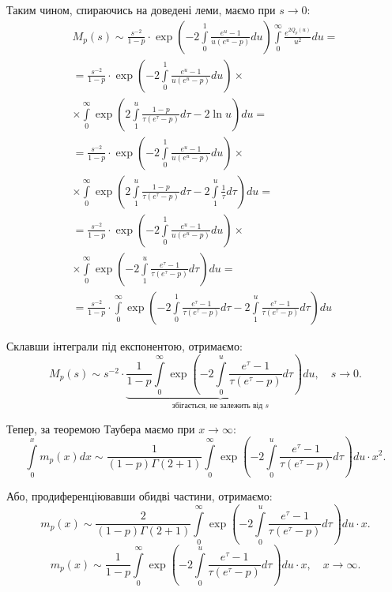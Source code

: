 Таким чином, спираючись на доведені леми, маємо при $s \rightarrow 0$:
\begin{gather*}
M_p(s) \sim \frac{s^{-2}}{1-p} \cdot \exp\left(-2\int\limits_0^1 \frac{e^u  - 1}{u(e^u - p)} du\right) \int\limits_0^\infty \frac{e^{2Q_p(u)}}{u^2} du = \\
 = \frac{s^{-2}}{1-p} \cdot \exp\left(-2\int\limits_0^1 \frac{e^u  - 1}{u(e^u - p)} du\right) \times \\
 \times \int\limits_0^\infty \exp\left(2\int\limits_1^u \frac{1- p}{\tau(e^\tau - p)} d\tau - 2 \ln u\right) du = \\
 = \frac{s^{-2}}{1-p} \cdot \exp\left(-2\int\limits_0^1 \frac{e^u  - 1}{u(e^u - p)} du\right) \times \\
 \times \int\limits_0^\infty \exp\left(2\int\limits_1^u \frac{1- p}{\tau(e^\tau - p)} d\tau - 2  \int\limits_1^u  \frac{1}{\tau} d\tau \right) du = \\
 = \frac{s^{-2}}{1-p} \cdot \exp\left(-2\int\limits_0^1 \frac{e^u  - 1}{u(e^u - p)} du\right)\times \\
 \times \int\limits_0^\infty \exp\left(-2\int\limits_1^u \frac{e^{\tau} - 1}{\tau(e^\tau - p)} d\tau  \right) du = \\
 = \frac{s^{-2}}{1-p} \cdot \int\limits_0^\infty \exp\left( -2\int\limits_0^1 \frac{e^{\tau} - 1}{\tau(e^\tau - p)} d\tau -2\int\limits_1^u \frac{e^{\tau} - 1}{\tau(e^\tau - p)} d\tau  \right) du 
\end{gather*}

Склавши інтеграли під експонентою, отримаємо:
\begin{equation}
M_p(s) \sim s^{-2} \cdot \underbrace{\frac{1}{1-p} \int\limits_0^\infty \exp\left( -2\int\limits_0^u \frac{e^{\tau} - 1}{\tau(e^\tau - p)} d\tau  \right) du}_{\text{збігається, не залежить від } s}, \quad s \rightarrow 0.
\end{equation}

Тепер, за теоремою Таубера маємо при $x \rightarrow \infty$:
\begin{equation}
\int\limits_0^x m_p(x) dx \sim \frac{1}{(1-p)\Gamma(2 + 1)} \int\limits_0^\infty \exp\left( -2\int\limits_0^u \frac{e^{\tau} - 1}{\tau(e^\tau - p)} d\tau  \right) du \cdot x^2.
\end{equation}

Або, продиференціювавши обидві частини,  отримаємо:
\begin{equation*}
m_p(x) \sim \frac{2}{(1- p) \Gamma(2 + 1)} \int\limits_0^\infty \exp\left( -2\int\limits_0^u \frac{e^{\tau} - 1}{\tau(e^\tau - p)} d\tau  \right) du \cdot x.
\end{equation*}
\begin{equation}
\label{eq:model_final}
m_p(x) \sim \frac{1}{1-p} \int\limits_0^\infty \exp\left( -2\int\limits_0^u \frac{e^{\tau} - 1}{\tau(e^\tau - p)} d\tau  \right) du \cdot x, \quad x \rightarrow \infty.
\end{equation}

